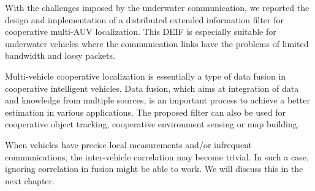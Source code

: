 With the challenges imposed by the underwater communication, we reported the design and implementation of a distributed extended information filter for cooperative multi-AUV localization. This DEIF is especially suitable for underwater vehicles where the communication links have the problems of limited bandwidth and lossy packets.

Multi-vehicle cooperative localization is essentially a type of data fusion in cooperative intelligent vehicles. Data fusion, which aims at integration of data and knowledge from multiple sources, is an important process to achieve a better estimation in various applications. The proposed filter can also be used for cooperative object tracking, cooperative environment sensing or map building.

When vehicles have precise local measurements and/or infrequent communications, the inter-vehicle correlation may become trivial. In such a case, ignoring correlation in fusion might be able to work. We will discuss this in the next chapter. 
